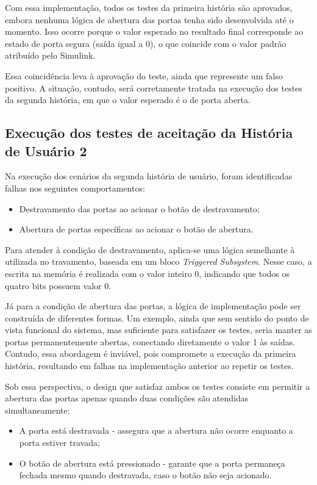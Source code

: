 Com essa implementação, todos os testes da primeira história são aprovados, embora nenhuma lógica de abertura das portas tenha sido desenvolvida até o momento. Isso 
ocorre porque o valor esperado no resultado final corresponde ao estado de porta segura (saída igual a 0), o que coincide com o valor padrão atribuído pelo Simulink.

Essa coincidência leva à aprovação do teste, ainda que represente um falso positivo. A situação, contudo, será corretamente tratada na execução dos testes da segunda 
história, em que o valor esperado é o de porta aberta.


\subsection{Execução dos testes de aceitação da História de Usuário 2}

Na execução dos cenários da segunda história de usuário, foram identificadas falhas nos seguintes comportamentos:

\begin{itemize}
	\item Destravamento das portas ao acionar o botão de destravamento;
	\item Abertura de portas específicas ao acionar o botão de abertura.
\end{itemize}

Para atender à condição de destravamento, aplica-se uma lógica semelhante à utilizada no travamento, baseada em um bloco \textit{Triggered Subsystem}. Nesse caso, 
a escrita na memória é realizada com o valor inteiro 0, indicando que todos os quatro bits possuem valor 0.

Já para a condição de abertura das portas, a lógica de implementação pode ser construída de diferentes formas. Um exemplo, ainda que sem sentido do ponto de vista 
funcional do sistema, mas suficiente para satisfazer os testes, seria manter as portas permanentemente abertas, conectando diretamente o valor 1 às saídas. Contudo, 
essa abordagem é inviável, pois compromete a execução da primeira história, resultando em falhas na implementação anterior ao repetir os testes.

Sob essa perspectiva, o design que satisfaz ambos os testes consiste em permitir a abertura das portas apenas quando duas condições são atendidas simultaneamente:

\begin{itemize}
	\item A porta está destravada - assegura que a abertura não ocorre enquanto a porta estiver travada;
	\item O botão de abertura está pressionado - garante que a porta permaneça fechada mesmo quando destravada, caso o botão não seja acionado.
\end{itemize}

